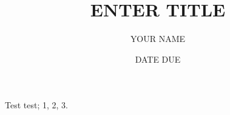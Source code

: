 \documentclass{article}
\begin{document}
\title{ENTER TITLE}
\author{YOUR NAME}
\date{DATE DUE}
\maketitle
Test test; 1, 2, 3.
\end{document}
